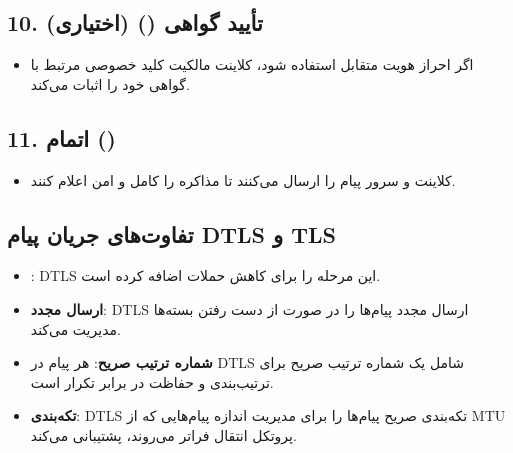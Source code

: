 \subsection*{10. تأیید گواهی () (اختیاری)}
\begin{itemize}
    \item اگر احراز هویت متقابل استفاده شود، کلاینت مالکیت کلید خصوصی مرتبط با گواهی خود را اثبات می‌کند.
\end{itemize}

\subsection*{11. اتمام ()}
\begin{itemize}
    \item کلاینت و سرور پیام  را ارسال می‌کنند تا مذاکره را کامل و امن اعلام کنند.
\end{itemize}

\subsection*{تفاوت‌های جریان پیام DTLS و TLS}
\begin{itemize}
    \item \textbf{}: DTLS این مرحله را برای کاهش حملات  اضافه کرده است.
    \item \textbf{ارسال مجدد}: DTLS ارسال مجدد پیام‌ها را در صورت از دست رفتن بسته‌ها مدیریت می‌کند.
    \item \textbf{شماره ترتیب صریح}: هر پیام در DTLS شامل یک شماره ترتیب صریح برای ترتیب‌بندی و حفاظت در برابر تکرار است.
    \item \textbf{تکه‌بندی}: DTLS تکه‌بندی صریح پیام‌ها را برای مدیریت اندازه پیام‌هایی که از MTU پروتکل انتقال فراتر می‌روند، پشتیبانی می‌کند.
\end{itemize}
